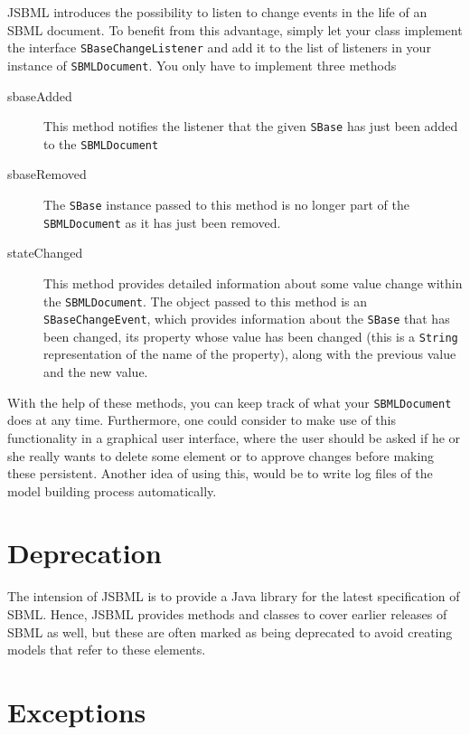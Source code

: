 \documentclass[
  letterpaper,
  11pt,
  headsepline,
  pointlessnumbers,
  tablecaptionabove,
  headinclude,
  appendixprefix,
  idxtotoc,
  bibtotoc,
  titlepage
]{scrartcl}
\begin{document}
JSBML introduces the possibility to listen to change events in the life of an
SBML document. To benefit from this advantage, simply let your class implement
the interface \verb!SBaseChangeListener! and add it to the list of listeners in
your instance of  \verb!SBMLDocument!. You only have to implement three methods
\begin{description}
 \item[sbaseAdded] This method notifies the listener that the given \verb!SBase!
   has just been added to the \verb!SBMLDocument!
 \item[sbaseRemoved] The \verb!SBase! instance passed to this method is no
   longer part of the \verb!SBMLDocument! as it has just been removed.
 \item[stateChanged] This method provides detailed information about some value
   change within the \verb!SBMLDocument!. The object passed to this method is
   an \verb!SBaseChangeEvent!, which provides information about the \verb!SBase!
   that has been changed, its property whose value has been changed (this is a
   \verb!String! representation of the name of the property), along with the
   previous value and the new value.
\end{description}
With the help of these methods, you can keep track of what your
\verb!SBMLDocument! does at any time. Furthermore, one could consider to make
use of this functionality in a graphical user interface, where the user should
be asked if he or she really wants to delete some element or to approve changes
before making these persistent. Another idea of using this, would be to write
log files of the model building process automatically.


\section{Deprecation}

The intension of JSBML is to provide a Java library for the latest 
specification of SBML. Hence, JSBML provides methods and classes to
cover earlier releases of SBML as well, but these are often marked
as being deprecated to avoid creating models that refer to these 
elements.

\section{Exceptions}
\end{document}
